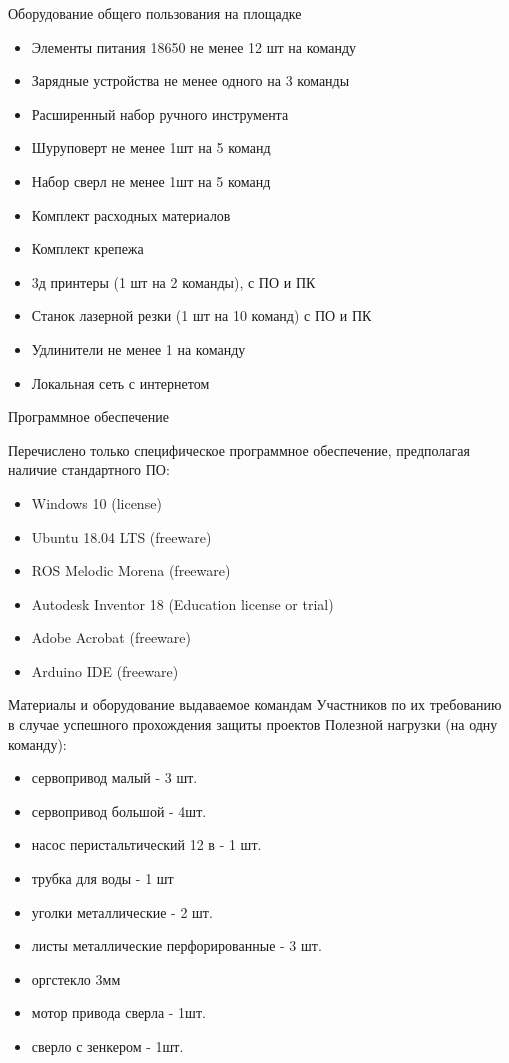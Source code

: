 Оборудование общего пользования на площадке
\begin{itemize}
    \item Элементы питания 18650 не менее 12 шт на команду
    \item Зарядные устройства не менее одного на 3 команды
    \item Расширенный набор ручного инструмента 
    \item Шуруповерт не менее 1шт на 5 команд
    \item Набор сверл не менее 1шт на 5 команд
    \item Комплект расходных материалов 
    \item Комплект крепежа
    \item 3д принтеры (1 шт на 2 команды), с ПО и ПК
    \item Станок лазерной резки (1 шт на 10 команд) с ПО и ПК
    \item Удлинители не менее 1 на команду
    \item Локальная сеть с интернетом
\end{itemize}

Программное обеспечение

Перечислено только специфическое программное обеспечение, предполагая наличие стандартного ПО:
\begin{itemize}
    \item Windows 10 (license)
    \item Ubuntu 18.04 LTS (freeware)
    \item ROS Melodic Morena (freeware)
    \item Autodesk Inventor 18 (Education license or trial)
    \item Adobe Acrobat (freeware)
    \item Arduino IDE (freeware)
\end{itemize}

Материалы и оборудование выдаваемое командам Участников по их требованию в случае успешного прохождения защиты проектов Полезной нагрузки (на одну команду):
\begin{itemize}
    \item сервопривод малый - 3 шт.
    \item сервопривод большой - 4шт.
    \item насос перистальтический 12 в - 1 шт.
    \item трубка для воды - 1 шт
    \item уголки металлические - 2 шт.
    \item листы металлические перфорированные - 3 шт.
    \item оргстекло 3мм
    \item мотор привода сверла - 1шт.
    \item сверло с зенкером - 1шт.
\end{itemize}

